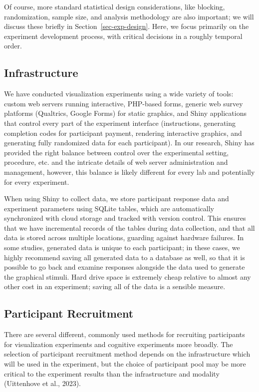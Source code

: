 \documentclass[
  10pt,
]{article}
\begin{document}
Of course, more standard statistical design considerations, like
blocking, randomization, sample size, and analysis methodology are also
important; we will discuss these briefly in
Section~\ref{sec-exp-design}. Here, we focus primarily on the experiment
development process, with critical decisions in a roughly temporal
order.

\subsection{Infrastructure}\label{infrastructure}

We have conducted visualization experiments using a wide variety of
tools: custom web servers running interactive, PHP-based forms, generic
web survey platforms (Qualtrics, Google Forms) for static graphics, and
Shiny applications that control every part of the experiment interface
(instructions, generating completion codes for participant payment,
rendering interactive graphics, and generating fully randomized data for
each participant). In our research, Shiny has provided the right balance
between control over the experimental setting, procedure, etc. and the
intricate details of web server administration and management, however,
this balance is likely different for every lab and potentially for every
experiment.

When using Shiny to collect data, we store participant response data and
experiment parameters using SQLite tables, which are automatically
synchronized with cloud storage and tracked with version control. This
ensures that we have incremental records of the tables during data
collection, and that all data is stored across multiple locations,
guarding against hardware failures. In some studies, generated data is
unique to each participant; in these cases, we highly recommend saving
all generated data to a database as well, so that it is possible to go
back and examine responses alongside the data used to generate the
graphical stimuli. Hard drive space is extremely cheap relative to
almost any other cost in an experiment; saving all of the data is a
sensible measure.

\subsection{Participant Recruitment}\label{participant-recruitment}

There are several different, commonly used methods for recruiting
participants for visualization experiments and cognitive experiments
more broadly. The selection of participant recruitment method depends on
the infrastructure which will be used in the experiment, but the choice
of participant pool may be more critical to the experiment results than
the infrastructure and modality (Uittenhove et al., 2023).
\end{document}
